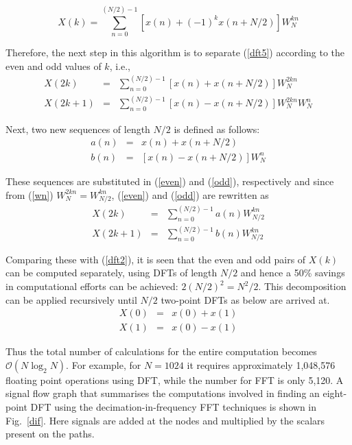\documentclass[a4paper,11pt]{article}
\begin{document}
\begin{equation} \label{dft5}
X(k) = \sum_{n=0}^{(N/2) - 1} \left[ x(n) + (-1)^{k} x(n+N/2) \right] W_{N}^{kn}
\end{equation}

Therefore, the next step in this algorithm is to separate (\ref{dft5}) according to the even and odd values of $k$, i.e., 
\begin{eqnarray}
X(2k) & = & \sum_{n=0}^{(N/2) - 1} \left[ x(n) + x(n+N/2) \right] W_{N}^{2kn} \label{even}\\
X(2k+1) & = & \sum_{n=0}^{(N/2) - 1} \left[ x(n) - x(n+N/2) \right] W_{N}^{2kn} W_{N}^{n} \label{odd}
\end{eqnarray}

Next, two new sequences of length $N/2$ is defined as follows:
\begin{eqnarray}
a(n) & = & x(n) + x(n+N/2) \nonumber \\
b(n) & = & \left[ x(n) - x(n+N/2) \right] W_{N}^{n} \nonumber
\end{eqnarray}

These sequences are substituted in (\ref{even}) and (\ref{odd}), respectively and since from (\ref{wn}) $W_{N}^{2kn} = W_{N/2}^{kn}$, (\ref{even}) and (\ref{odd}) are rewritten as
\begin{eqnarray}
X(2k) & = & \sum_{n=0}^{(N/2) - 1} a(n) W_{N/2}^{kn} \label{even2} \\
X(2k+1) & = & \sum_{n=0}^{(N/2) - 1} b(n) W_{N/2}^{kn} \label{odd2}
\end{eqnarray}

Comparing these with (\ref{dft2}), it is seen that the even and odd pairs of $X(k)$ can be computed separately, using DFTs of length $N/2$ and hence a 50\% savings in computational efforts can be achieved: $2(N/2)^2=N^{2}/{2}$. This decomposition can be applied recursively until $N/2$ two-point DFTs as below are arrived at. 
\begin{eqnarray}
X(0) & = & x(0) + x(1) \\
X(1) & = & x(0) - x(1)
\end{eqnarray}

Thus the total number of calculations for the entire computation becomes ${\mathcal O}(N\log_{2} N)$. For example, for $N=1024$ it requires approximately 1,048,576 floating point operations using DFT, while the number for FFT is only 5,120. \cite{schilling} A signal flow graph that summarises the computations involved in finding an eight-point DFT using the decimation-in-frequency FFT techniques is shown in Fig.~\ref{dif}. Here signals are added at the nodes and multiplied by the scalars present on the paths. \cite{chapra}
\end{document}
